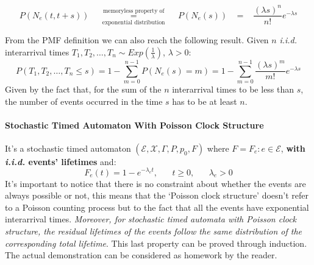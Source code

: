 \documentclass[12pt,a4paper]{article}
\begin{document}
\begin{equation}
P\left(N_e(t,t+s)\right)\hspace{15pt}\underset{\textrm{exponential distribution}}
{\overset{\textrm{memoryless property of}}{=}}\hspace{15pt}P\left(N_e(s)\right)\hspace{10pt}=
\hspace{10pt}\frac{(\lambda s)^n}{n!}e^{-\lambda s}
\end{equation}

\noindent
From the PMF definition we can also reach the following result. Given $n$ \textit{i.i.d.} interarrival times $T_1,T_2,\dots,T_n \sim Exp\left(\frac{1}{\lambda}\right)$, $\lambda>0$:
$$
P\left(T_1,T_2,\dots,T_n \leq s\right) = 1-\sum_{m=0}^{n-1}P(N_e(s)=m)=1-\sum_{m=0}^{n-1}
\frac{(\lambda s)^m}{m!}e^{-\lambda s}
$$
Given by the fact that, for the sum of the $n$ interarrival times to be less than $s$, the number of events occurred in the time $s$ has to be at least $n$.
\newpage
\paragraph{Stochastic Timed Automaton With Poisson Clock Structure}
It's a stochastic timed automaton 
$(\mathcal{E},\mathcal{X},\Gamma,P,p_0,F)$ where $F={F_e : e\in \mathcal{E}}$, \textbf{with \textit{i.i.d.} events' lifetimes} and:
$$
F_e(t)=1-e^{-\lambda_e t},\hspace{20pt}t\geq 0,\hspace{20pt}\lambda_e>0
$$
It's important to notice that there is no constraint about whether the events are always possible or not, this means that the `Poisson clock structure' doesn't refer to a Poisson counting process but to the fact that all the events have exponential interarrival times.
\emph{Moreover, for stochastic timed automata with Poisson clock structure, the residual lifetimes of the events follow the same distribution of the corresponding total lifetime}. This last property can be proved through induction. The actual demonstration can be considered as homework by the reader.
\end{document}
